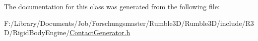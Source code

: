 The documentation for this class was generated from the following file\+:\begin{DoxyCompactItemize}
\item 
F\+:/\+Library/\+Documents/\+Job/\+Forschungsmaster/\+Rumble3\+D/\+Rumble3\+D/include/\+R3\+D/\+Rigid\+Body\+Engine/\hyperlink{_contact_generator_8h}{Contact\+Generator.\+h}\end{DoxyCompactItemize}
